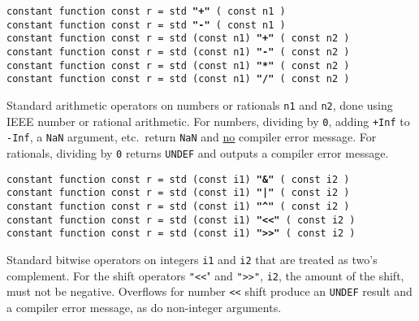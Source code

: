 \documentclass[12pt]{article}
\newcommand{\ttkey}[1]{{\tt \bfseries #1}}
\newenvironment{indpar}[1][0.3in]%
	{\begin{list}{}%
		     {\setlength{\itemsep}{0in}%
		      \setlength{\topsep}{0in}%
		      \setlength{\parsep}{1ex}%
		      \setlength{\labelwidth}{#1}%
		      \setlength{\leftmargin}{#1}%
		      \addtolength{\leftmargin}{\labelsep}}%
	 \item}%
	{\end{list}}
\begin{document}
{\tt constant function const r = std \ttkey{"+"} ( const n1 )} \\
{\tt constant function const r = std \ttkey{"-"} ( const n1 )} \\
{\tt constant function const r = std (const n1) \ttkey{"+"} ( const n2 )} \\
{\tt constant function const r = std (const n1) \ttkey{"-"} ( const n2 )} \\
{\tt constant function const r = std (const n1) \ttkey{"*"} ( const n2 )} \\
{\tt constant function const r = std (const n1) \ttkey{"/"} ( const n2 )}
\begin{indpar}
Standard arithmetic operators on numbers or rationals {\tt n1} and {\tt n2},
done using IEEE number or rational arithmetic.
For numbers, dividing by {\tt 0},
adding {\tt +Inf} to {\tt -Inf}, a {\tt NaN} argument, etc.~return
{\tt NaN} and \underline{no} compiler error message.
For rationals, dividing by {\tt 0} returns {\tt UNDEF} and outputs a
compiler error message.
\end{indpar}

{\tt constant function const r = std (const i1) \ttkey{"\&"} ( const i2 )} \\
{\tt constant function const r = std (const i1) \ttkey{"|"} ( const i2 )} \\
{\tt constant function const r = std (const i1) \ttkey{"\textasciicircum"}
                            ( const i2 )} \\
{\tt constant function const r = std (const i1) \ttkey{"<{}<"} ( const i2 )} \\
{\tt constant function const r = std (const i1) \ttkey{">{}>"} ( const i2 )}
\begin{indpar}
Standard bitwise operators on integers {\tt i1} and {\tt i2}
that are treated as two's complement.  For the shift operators
{\tt "<{}<}" and {\tt ">{}>"}, {\tt i2}, the amount of the shift,
must not be negative.  Overflows for number {\tt <{}<} shift
produce an {\tt UNDEF} result and a compiler error message,
as do non-integer arguments.
\end{indpar}
\end{document}
